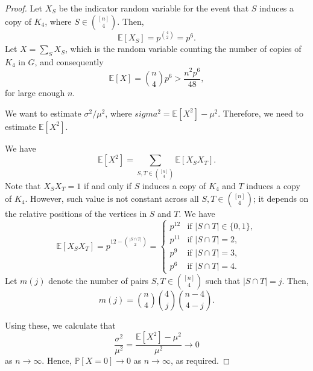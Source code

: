 \begin{proof}
    Let \(X_S\) be the indicator random variable for the event that \(S\) induces a copy of \(K_4\), where \(S \in \binom{[n]}{4}\).
    Then,
    \begin{equation}
        \mathbb{E}[X_S] = p^{\binom{4}{2}} = p^6.
    \end{equation}
    Let \(X = \sum_{S} X_S\), which is the random variable counting the number of copies of \(K_4\) in \(G\), and consequently
    \begin{equation}
        \mathbb{E}[X] = \binom{n}{4} p^6 > \frac{n^2p^6}{48},
    \end{equation}
    for large enough \(n\).

    We want to estimate \(\sigma^2/\mu^2\), where \(sigma^2 = \mathbb{E}[X^2] - \mu^2\).
    Therefore, we need to estimate \(\mathbb{E}[X^2]\).

    We have
    \begin{equation}
        \mathbb{E}[X^2] = \sum_{S, T \in \binom{[n]}{4}} \mathbb{E}[X_S X_T].
    \end{equation}
    Note that \(X_S X_T = 1\) if and only if \(S\) induces a copy of \(K_4\) and \(T\) induces a copy of \(K_4\).
    However, such value is not constant across all \(S, T \in \binom{[n]}{4}\);
    it depends on the relative positions of the vertices in \(S\) and \(T\).
    We have
    \begin{equation}
        \mathbb{E}[X_S X_T] = p^{12 - \binom{|S \cap T|}{2}}
        = \begin{cases}
            p^{12} & \text{if } |S \cap T| \in \{0, 1\}, \\
            p^{11} & \text{if } |S \cap T| = 2,\\
            p^{9} & \text{if } |S \cap T| = 3,\\
            p^{6} & \text{if } |S \cap T| = 4.
        \end{cases}
    \end{equation}
    Let \(m(j)\) denote the number of pairs \(S, T \in \binom{[n]}{4}\) such that \(|S \cap T| = j\).
    Then,
    \begin{equation}
        m(j) = \binom{n}{4} \binom{4}{j} \binom{n-4}{4-j}.
    \end{equation}

    Using these, we calculate that
    \begin{equation}
        \frac{\sigma^2}{\mu^2} = \frac{\mathbb{E}[X^2] - \mu^2}{\mu^2} \to 0
    \end{equation}
    as \(n \to \infty\).
    Hence, \(\mathbb{P}[X = 0] \to 0\) as \(n \to \infty\), as required.
\end{proof}